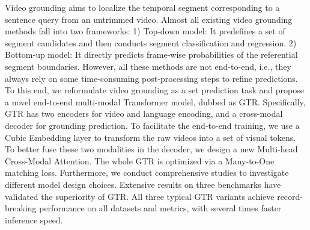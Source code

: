 Video grounding aims to localize the temporal segment corresponding to a sentence query from an untrimmed video. Almost all existing video grounding methods fall into two frameworks: 1) Top-down model: It predefines a set of segment candidates and then conducts segment classification and regression. 2) Bottom-up model: It directly predicts frame-wise probabilities of the referential segment boundaries. However, all these methods are not end-to-end, i.e., they always rely on some time-consuming post-processing steps to refine predictions. To this end, we reformulate video grounding as a set prediction task and propose a novel end-to-end multi-modal Transformer model, dubbed as GTR. Specifically, GTR has two encoders for video and language encoding, and a cross-modal decoder for grounding prediction. To facilitate the end-to-end training, we use a Cubic Embedding layer to transform the raw videos into a set of visual tokens. To better fuse these two modalities in the decoder, we design a new Multi-head Cross-Modal Attention. The whole GTR is optimized via a Many-to-One matching loss. Furthermore, we conduct comprehensive studies to investigate different model design choices. Extensive results on three benchmarks have validated the superiority of GTR. All three typical GTR variants achieve record-breaking performance on all datasets and metrics, with several times faster inference speed.
